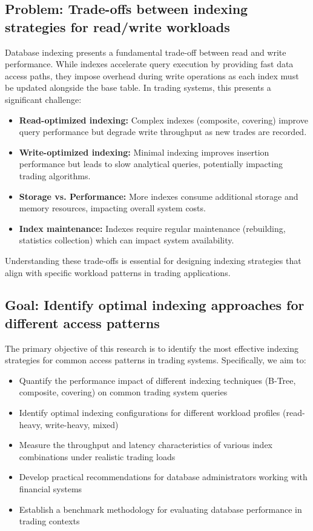 \documentclass[11pt,a4paper]{article}
\begin{document}
\subsection{Problem: Trade-offs between indexing strategies for read/write workloads}

Database indexing presents a fundamental trade-off between read and write performance. While indexes accelerate query execution by providing fast data access paths, they impose overhead during write operations as each index must be updated alongside the base table. In trading systems, this presents a significant challenge:

\begin{itemize}
    \item \textbf{Read-optimized indexing:} Complex indexes (composite, covering) improve query performance but degrade write throughput as new trades are recorded.
    \item \textbf{Write-optimized indexing:} Minimal indexing improves insertion performance but leads to slow analytical queries, potentially impacting trading algorithms.
    \item \textbf{Storage vs. Performance:} More indexes consume additional storage and memory resources, impacting overall system costs.
    \item \textbf{Index maintenance:} Indexes require regular maintenance (rebuilding, statistics collection) which can impact system availability.
\end{itemize}

Understanding these trade-offs is essential for designing indexing strategies that align with specific workload patterns in trading applications.

\subsection{Goal: Identify optimal indexing approaches for different access patterns}

The primary objective of this research is to identify the most effective indexing strategies for common access patterns in trading systems. Specifically, we aim to:

\begin{itemize}
    \item Quantify the performance impact of different indexing techniques (B-Tree, composite, covering) on common trading system queries
    \item Identify optimal indexing configurations for different workload profiles (read-heavy, write-heavy, mixed)
    \item Measure the throughput and latency characteristics of various index combinations under realistic trading loads
    \item Develop practical recommendations for database administrators working with financial systems
    \item Establish a benchmark methodology for evaluating database performance in trading contexts
\end{itemize}
\end{document}
